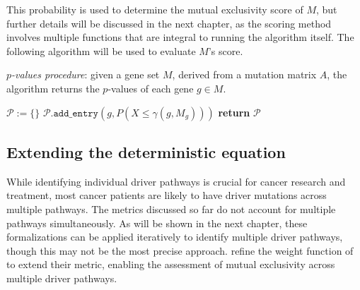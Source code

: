 \begin{table}[H] \label{contingency}
    \centering
    \caption{Fisher's exact test}
\end{table}

This probability is used to determine the mutual exclusivity score of $M$, but further details will be discussed in the next chapter, as the scoring method involves multiple functions that are integral to running the algorithm itself. The following algorithm will be used to evaluate $M$'s score.

\begin{algorithm}[H]
    \caption{
        \textit{$p$-values procedure}: given a gene set $M$, derived from a mutation matrix $A$, the algorithm returns the $p$-values of each gene $g \in M$.
    }

        \label{p-values_procedure}
    \begin{algorithmic}[1]
            \State $\mathcal P := \texttt{\{\}}$
                \State $\mathcal P.\texttt{add\_entry}(g, P(X \le \gamma(g, M_g)))$ 
            \EndFor
            \State \textbf{return} $\mathcal P$
        \EndFunction
    \end{algorithmic}
\end{algorithm}

\subsection{Extending the deterministic equation} \label{multi_dendrix_2nd_chap}

While identifying individual driver pathways is crucial for cancer research and treatment, most cancer patients are likely to have driver mutations across multiple pathways. The metrics discussed so far do not account for multiple pathways simultaneously. As will be shown in the next chapter, these formalizations can be applied iteratively to identify multiple driver pathways, though this may not be the most precise approach. \textcite{multi-dendrix} refine the weight function of \textcite{dendrix} to extend their metric, enabling the assessment of mutual exclusivity across multiple driver pathways.

